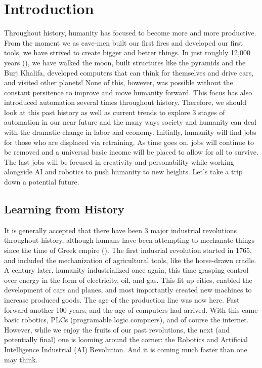 \section{Introduction}

Throughout history, humanity has focused to become more and more productive. From the moment we as cave-men built our first fires and developed our first tools, we have strived to create bigger and better things. In just roughly 12,000 years (\cite{HumanHistory}), we have walked the moon, built structures like the pyramids and the Burj Khalifa, developed computers that can think for themselves and drive cars, and visited other planets! None of this, however, was possible without the constant persitence to improve and move humanity forward. This focus has also introduced automation several times throughout history. Therefore, we should look at this past history as well as current trends to explore 3 stages of automation in our near future and the many ways society and humanity can deal with the dramatic change in labor and economy. Initially, humanity will find jobs for those who are displaced via retraining. As time goes on, jobs will continue to be removed and a universal basic income will be placed to allow for all to survive. The last jobs will be focused in creativity and personability while working alongside AI and robotics to push humanity to new heights. Let's take a trip down a potential future.

\subsection{Learning from History}

It is generally accepted that there have been 3 major industrial revolutions throughout history, although humans have been attempting to mechanate things since the time of Greek empire (\cite{AutomationPeriods}). The first indusrial revolution started in 1765, and included the mechanization of agricultural tools, like the horse-drawn cradle. A century later, humanity industrialized once again, this time grasping control over energy in the form of electricity, oil, and gas. This lit up cities, enabled the development of cars and planes, and most importantly created new machines to increase produced goods. The age of the production line was now here. Fast forward another 100 years, and the age of computers had arrived. With this came basic robotics, PLCs (programable logic compuers), and of course the internet. However, while we enjoy the fruits of our past revolutions, the next (and potentially final) one is looming around the corner: the Robotics and Artificial Intelligence Industrial (AI) Revolution. And it is coming much faster than one may think.

